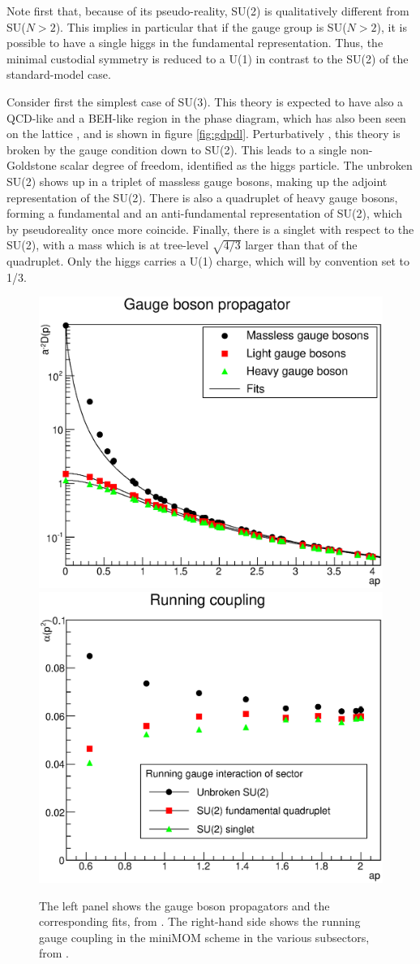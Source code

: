 \documentclass[final,12pt,3p,longtitle]{elsarticle}
\newcommand*{\1}{1\!\!\!\bot}
\begin{document}
Note first that, because of its pseudo-reality, SU(2) is qualitatively different from SU($N>2$). This implies in particular that if the gauge group is SU($N>2$), it is possible to have a single higgs in the fundamental representation. Thus, the minimal custodial symmetry is reduced to a U(1) in contrast to the SU(2) of the standard-model case.

Consider first the simplest case of SU(3). This theory is expected to have also a QCD-like and a BEH-like region in the phase diagram, which has also been seen on the lattice \cite{Maas:2016ngo}, and is shown in figure \ref{fig:gdpdl}. Perturbatively \cite{Bohm:2001yx,Maas:2016ngo}, this theory is broken by the gauge condition down to SU(2). This leads to a single non-Goldstone scalar degree of freedom, identified as the higgs particle. The unbroken SU(2) shows up in a triplet of massless gauge bosons, making up the adjoint representation of the SU(2). There is also a quadruplet of heavy gauge bosons, forming a fundamental and an anti-fundamental representation of SU(2), which by pseudoreality once more coincide. Finally, there is a singlet with respect to the SU(2), with a mass which is at tree-level $\sqrt{4/3}$ larger than that of the quadruplet. Only the higgs carries a U(1) charge, which will by convention set to 1/3.

\begin{figure}
\includegraphics[width=0.5\linewidth]{WPropV20}\includegraphics[width=0.5\linewidth]{alpha-gut}
\caption{\label{fig:gut}The left panel shows the gauge boson propagators and the corresponding fits, from \cite{Maas:2016ngo}. The right-hand side shows the running gauge coupling in the miniMOM scheme in the various subsectors, from \cite{Maas:unpublishedtoerek}.}
\end{figure}
\end{document}
